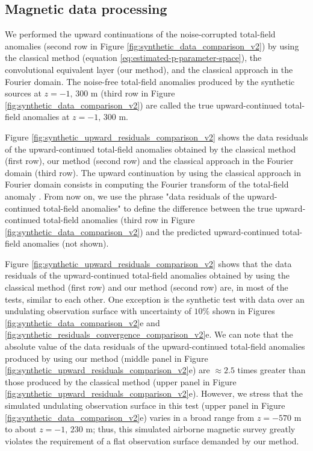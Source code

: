 \subsection*{Magnetic data processing}

We performed the upward continuations of the noise-corrupted total-field anomalies 
(second row in Figure \ref{fig:synthetic_data_comparison_v2}) by using 
the classical method (equation \ref{eq:estimated-p-parameter-space}), 
the convolutional equivalent layer (our method), and 
the classical approach in the Fourier domain.
The noise-free total-field anomalies produced by the synthetic sources at $z = -1, \, 300$ m 
(third row in Figure \ref{fig:synthetic_data_comparison_v2}) are called the true upward-continued total-field anomalies at $z = -1, \, 300$ m.

Figure \ref{fig:synthetic_upward_residuals_comparison_v2} shows the data residuals of the upward-continued total-field anomalies obtained by the classical method (first row), our method (second row) and the classical approach in the Fourier domain (third row).
The upward continuation by using the classical approach in Fourier domain consists in  
computing the Fourier transform of the total-field anomaly \citep[][ p. 317]{blakely1996}. 
From now on, we use the phrase "data residuals of the upward-continued total-field anomalies" to define the difference between the true upward-continued total-field anomalies (third row in Figure \ref{fig:synthetic_data_comparison_v2}) and the predicted upward-continued total-field anomalies (not shown).


Figure \ref{fig:synthetic_upward_residuals_comparison_v2} shows that the data residuals of the upward-continued total-field anomalies obtained by using the classical method (first row) and our method (second row) are, in most of the tests, similar to each other. 
One exception is the synthetic test with data over an undulating observation surface with uncertainty 
of $10\%$ shown in Figures \ref{fig:synthetic_data_comparison_v2}e and 
\ref{fig:synthetic_residuals_convergence_comparison_v2}e.
We can note that the absolute value of the data residuals of the upward-continued total-field anomalies produced by using our method (middle panel in Figure \ref{fig:synthetic_upward_residuals_comparison_v2}e) 
are $\approx 2.5$ times greater than those produced by the classical method 
(upper panel in Figure \ref{fig:synthetic_upward_residuals_comparison_v2}e).
However, we stress that the simulated undulating observation surface in this test  
(upper panel in Figure \ref{fig:synthetic_data_comparison_v2}e) varies in a broad range from $z = - 570$ m to about $z = -1,\, 230$ m; thus, this simulated airborne magnetic survey greatly violates the requirement 
of a flat observation surface demanded by our method.

